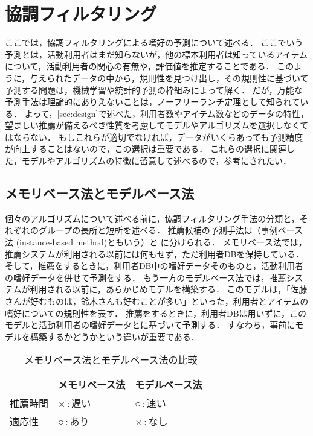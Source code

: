 \chapter{協調フィルタリング}
\label{chap:cf}

ここでは，協調フィルタリングによる嗜好の予測について述べる．
ここでいう予測とは，活動利用者はまだ知らないが，他の標本利用者は知っているアイテムについて，活動利用者の関心の有無や，評価値を推定することである．
このように，与えられたデータの中から，規則性を見つけ出し，その規則性に基づいて予測する問題は，機械学習や統計的予測の枠組みによって解く．
だが，万能な予測手法は理論的にありえないことは，ノーフリーランチ定理として知られている．
よって，\ref{sec:design}で述べた，利用者数やアイテム数などのデータの特性，望ましい推薦が備えるべき性質を考慮してモデルやアルゴリズムを選択しなくてはならない．
もしこれらが適切でなければ，データがいくらあっても予測精度が向上することはないので，この選択は重要である．
これらの選択に関連した，モデルやアルゴリズムの特徴に留意して述べるので，参考にされたい．

\section{メモリベース法とモデルベース法}
\label{sec:memory-model}


個々のアルゴリズムについて述べる前に，協調フィルタリング手法の分類と，それぞれのグループの長所と短所を述べる．
推薦候補の予測手法は（事例ベース法 (instance-based method)ともいう）と
 に分けられる\cite{uai:98:01}．
メモリベース法では，推薦システムが利用される以前には何もせず，ただ利用者DBを保持している．
そして，推薦をするときに，利用者DB中の嗜好データそのものと，活動利用者の嗜好データを併せて予測をする．
もう一方のモデルベース法では，推薦システムが利用される以前に，あらかじめモデルを構築する．
このモデルは，「佐藤さんが好むものは，鈴木さんも好むことが多い」といった，利用者とアイテムの嗜好についての規則性を表す．
推薦をするときに，利用者DBは用いずに，このモデルと活動利用者の嗜好データとに基づいて予測する．
すなわち，事前にモデルを構築するかどうかという違いが重要である．

\begin{table}
\centering
\caption{メモリベース法とモデルベース法の比較}
\label{tab:memory-model}
\begin{tabular}{l@{\qquad}>{\centering}p{}>{\centering}p{}p{0pt}}\toprule
 & メモリベース法 & モデルベース法 & \\\midrule
推薦時間 & ×\,:\,遅い & ○\,:\,速い & \\
適応性   & ○\,:\,あり & ×\,:\,なし & \\
\bottomrule
\end{tabular}
\end{table}

